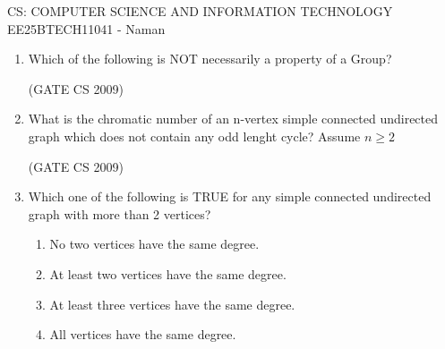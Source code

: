 \documentclass[a4paper, 11pt]{article}
\begin{document}
\begin{center}
    \huge{CS: COMPUTER SCIENCE AND INFORMATION TECHNOLOGY}\\
    \large{EE25BTECH11041 - Naman}
\end{center}

\begin{enumerate}
    \item Which of the following is NOT necessarily a property of a Group?
    \begin{enumerate}
    \end{enumerate}
    

    \hfill (GATE CS 2009)
    
    \item What is the chromatic number of an n-vertex simple connected undirected graph which does not contain any odd lenght cycle? Assume $n \geq 2$
    \begin{enumerate}
    \end{enumerate}

    \hfill (GATE CS 2009)

    \item Which one of the following is TRUE for any simple connected undirected graph with more than 2 vertices?
    \begin{enumerate}
        \item No two vertices have the same degree.
        \item At least two vertices have the same degree.
        \item At least three vertices have the same degree.
        \item All vertices have the same degree.
    \end{enumerate}


\end{enumerate}
\end{document}
